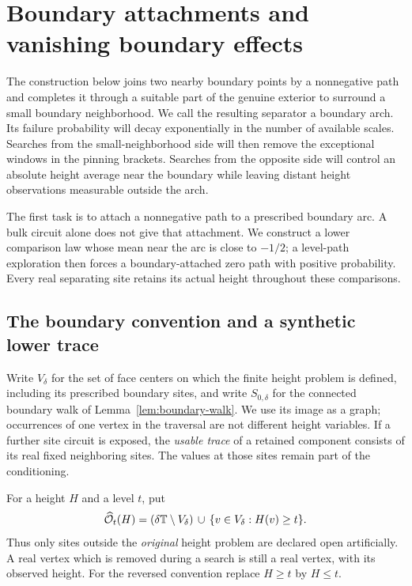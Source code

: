 \section{Boundary attachments and vanishing boundary effects}
\label{sec:boundary}

The construction below joins two nearby boundary points by a nonnegative
path and completes it through a suitable part of the genuine exterior
to surround a small boundary neighborhood.  We call the resulting
separator a boundary arch.  Its failure probability will decay
exponentially in the number of available scales.  Searches from the
small-neighborhood side will then remove the exceptional windows in the
pinning brackets.  Searches from the opposite side will control an
absolute height average near the boundary while leaving distant height
observations measurable outside the arch.

The first task is to attach a nonnegative path to a prescribed boundary
arc.  A bulk circuit alone does not give that attachment.  We construct
a lower comparison law whose mean near the arc is close to $-1/2$;
a level-path exploration then forces a boundary-attached zero path with
positive probability.  Every real separating site retains its actual
height throughout these comparisons.

\subsection{The boundary convention and a synthetic lower trace}

Write $V_\delta$ for the set of face centers on which the finite height
problem is defined, including its prescribed boundary sites, and write
$S_{0,\delta}$ for the connected boundary walk of
Lemma~\ref{lem:boundary-walk}.  We use its image as a graph; occurrences
of one vertex in the traversal are not different height variables.
If a further site circuit is exposed, the \emph{usable trace} of a
retained component consists of its real fixed neighboring sites.  The
values at those sites remain part of the conditioning.

For a height $H$ and a level $t$, put
\begin{equation}
 \widehat{\mathcal O}_t(H)
 = (\delta\mathbb T\setminus V_\delta)
   \,\cup\,\{v\in V_\delta:H(v)\ge t\}.
 \label{boundary:artificial-exterior}
\end{equation}
Thus only sites outside the \emph{original} height problem are declared
open artificially.  A real vertex which is removed during a search is
still a real vertex, with its observed height.  For the reversed
convention replace $H\ge t$ by $H\le t$.

